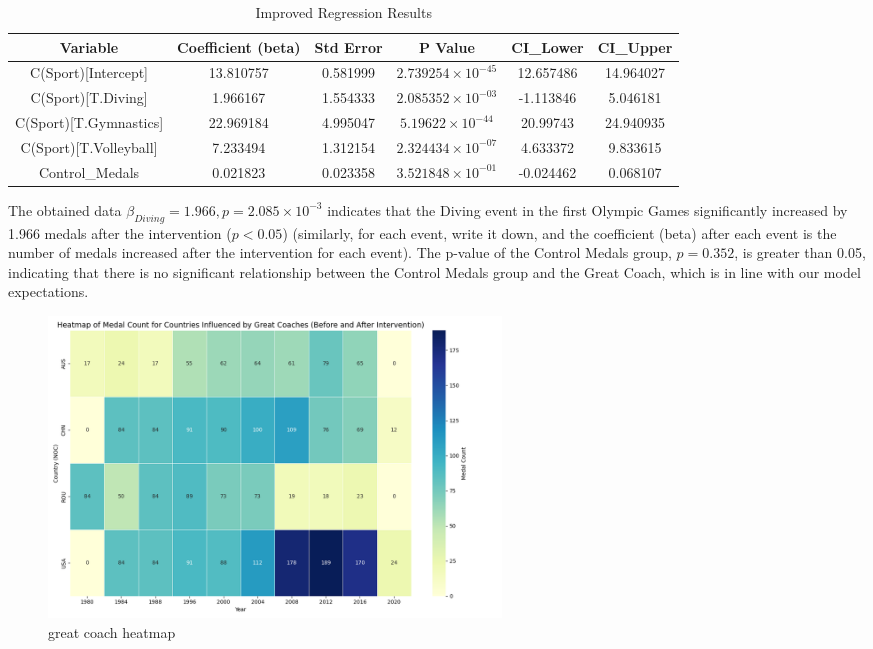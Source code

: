 \documentclass{mcmthesis}  %
\begin{document}
\begin{itemize}
\begin{table}[H]
\centering
\caption{Improved Regression Results}
\tabcolsep 3pt %
\begin{tabular}{cccccc}
\toprule
Variable & Coefficient (beta) & Std Error & P Value & CI\_Lower & CI\_Upper \\
\midrule
C(Sport)[Intercept] & 13.810757 & 0.581999 & $2.739254\times 10^{-45}$ & 12.657486 & 14.964027 \\
C(Sport)[T.Diving] & 1.966167 & 1.554333 & $2.085352\times 10^{-03}$ & -1.113846 & 5.046181 \\
C(Sport)[T.Gymnastics] & 22.969184 & 4.995047 & $5.19622\times 10^{-44}$ & 20.99743 & 24.940935 \\
C(Sport)[T.Volleyball] & 7.233494 & 1.312154 & $2.324434\times 10^{-07}$ & 4.633372 & 9.833615 \\
Control\_Medals & 0.021823 & 0.023358 & $3.521848\times 10^{-01}$ & -0.024462 & 0.068107 \\
\bottomrule
\end{tabular}
\end{table}
The obtained data \(\beta_{Diving} = 1.966, p = 2.085\times 10^{-3}\) indicates that the Diving event in the first Olympic Games significantly increased by 1.966 medals after the intervention (\(p < 0.05\)) (similarly, for each event, write it down, and the coefficient (beta) after each event is the number of medals increased after the intervention for each event). The p-value of the Control Medals group, \(p = 0.352\), is greater than 0.05, indicating that there is no significant relationship between the Control Medals group and the Great Coach, which is in line with our model expectations.

\begin{figure}[H]  %
\small
\centering  %
\includegraphics[width=12cm]{great_coach_heatmap.png}  %
\caption{great coach heatmap} 
\end{figure}  %


\end{itemize}
\end{document}
